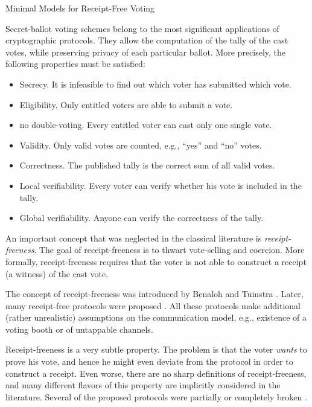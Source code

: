 \documentclass[E]{DASA}
\begin{document}
%
{Minimal Models for Receipt-Free Voting}

\intro

Secret-ballot voting schemes belong to the most significant applications of
cryptographic protocols. They allow the computation of the tally of the
cast votes, while preserving privacy of each particular ballot. More
precisely, the following properties must be satisfied:
\begin{itemize}\itemsep=0pt\parsep=0pt
\item {\sc Secrecy.} It is infeasible to find out which voter has submitted
  which vote.
\item {\sc Eligibility.} Only entitled voters are able to submit a vote.
\item {\sc no double-voting.} Every entitled voter can cast only one single
  vote.
\item {\sc Validity.} Only valid votes are counted, e.g., ``yes'' and
  ``no'' votes.
\item {\sc Correctness.} The published tally is the correct sum of all
  valid votes.
\item {\sc Local verifiability.} Every voter can verify whether his vote
  is included in the tally.
\item {\sc Global verifiability.} Anyone can verify the correctness of the
  tally.
\end{itemize}

An important concept that was neglected in the classical literature is
{\em receipt-freeness}. The goal of receipt-freeness is to thwart
vote-selling and coercion. More formally, receipt-freeness requires that
the voter is not able to construct a receipt (a witness) of the cast vote.

The concept of receipt-freeness was introduced by Benaloh and Tuinstra
\cite{BenTui94}. Later, many receipt-free protocols were proposed
\cite{SakKil95,Okamot96,Okamot97,HirSak00,LeeKim00,Hirt01,BPPSF01}.  All
these protocols make additional (rather unrealistic) assumptions on the
communication model, e.g., existence of a voting booth or of untappable
channels.

Receipt-freeness is a very subtle property. The problem is that the voter
{\em wants\/} to prove his vote, and hence he might even deviate from the
protocol in order to construct a receipt. Even worse, there are no sharp
definitions of receipt-freeness, and many different flavors of this
property are implicitly considered in the literature. Several of the
proposed protocols were partially or completely broken
\cite{MicHor96,Okamot97,Schoen99:pc,HirSak00}.
\end{document}
